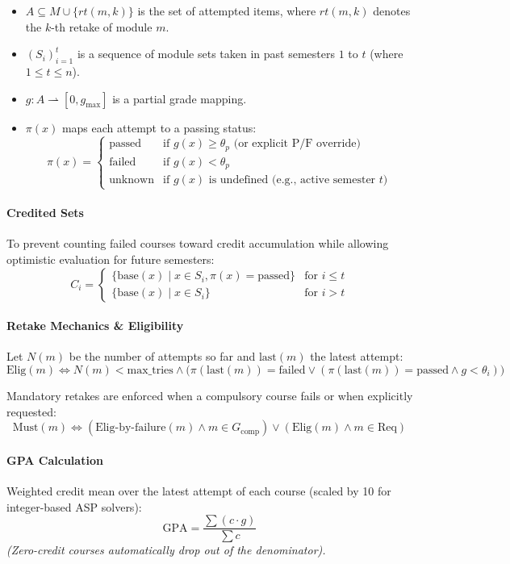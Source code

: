 \documentclass[10pt,a4paper]{article}
\begin{document}
\begin{itemize}
    \item $A \subseteq M \cup \{rt(m,k)\}$ is the set of attempted items, where $rt(m,k)$ denotes the $k$-th retake of module $m$.
    \item $(S_i)_{i=1}^{t}$ is a sequence of module sets taken in past semesters $1$ to $t$ (where $1 \le t \le n$).
    \item $g : A \rightharpoonup [0, g_{\max}]$ is a partial grade mapping.
    \item $\pi(x)$ maps each attempt to a passing status:
    $$\pi(x) = \begin{cases} 
    \text{passed} & \text{if } g(x) \ge \theta_p \text{ (or explicit P/F override)} \\
    \text{failed} & \text{if } g(x) < \theta_p \\
    \text{unknown} & \text{if } g(x) \text{ is undefined (e.g., active semester } t \text{)}
    \end{cases}$$
\end{itemize}

\paragraph{Credited Sets}

To prevent counting failed courses toward credit accumulation while allowing optimistic evaluation for future semesters:
$$C_i = \begin{cases} 
\{\text{base}(x) \mid x \in S_i, \pi(x) = \text{passed}\} & \text{for } i \le t \\
\{\text{base}(x) \mid x \in S_i\} & \text{for } i > t 
\end{cases}$$

\paragraph{Retake Mechanics \& Eligibility}
Let $N(m)$ be the number of attempts so far and $\text{last}(m)$ the latest attempt:
$$\text{Elig}(m) \iff N(m) < \text{max\_tries} \land \big(\pi(\text{last}(m)) = \text{failed} \lor (\pi(\text{last}(m)) = \text{passed} \land g < \theta_i)\big)$$

Mandatory retakes are enforced when a compulsory course fails or when explicitly requested:
$$\text{Must}(m) \iff (\text{Elig-by-failure}(m) \land m \in G_{\text{comp}}) \lor (\text{Elig}(m) \land m \in \text{Req})$$

\paragraph{GPA Calculation}
Weighted credit mean over the latest attempt of each course (scaled by 10 for integer-based ASP solvers):
$$\text{GPA} = \frac{\sum (c \cdot g)}{\sum c}$$
\emph{(Zero-credit courses automatically drop out of the denominator).}
\end{document}
